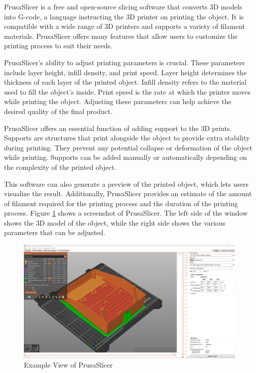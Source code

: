 PrusaSlicer is a free and open-source slicing software that converts 3D models into G-code, a language instructing the 3D printer on printing the object. It is compatible with a wide range of 3D printers and supports a variety of filament materials. PrusaSlicer offers many features that allow users to customize the printing process to suit their needs.

PrusaSlicer's ability to adjust printing parameters is crucial. These parameters include layer height, infill density, and print speed. Layer height determines the thickness of each layer of the printed object. Infill density refers to the material used to fill the object's inside. Print speed is the rate at which the printer moves while printing the object. Adjusting these parameters can help achieve the desired quality of the final product.

PrusaSlicer offers an essential function of adding support to the 3D prints. Supports are structures that print alongside the object to provide extra stability during printing. They prevent any potential collapse or deformation of the object while printing. Supports can be added manually or automatically depending on the complexity of the printed object.

This software can also generate a preview of the printed object, which lets users visualize the result. Additionally, PrusaSlicer provides an estimate of the amount of filament required for the printing process and the duration of the printing process. Figure \ref{fig:prusa_slicer} shows a screenshot of PrusaSlicer. The left side of the window shows the 3D model of the object, while the right side shows the various parameters that can be adjusted.

\begin{figure}
    \centering
    \includegraphics[width=0.8\linewidth]{texs/Part1/chapter1/image/prusaslicer.png}
    \caption{Example View of PrusaSlicer}
    \label{fig:prusa_slicer}
\end{figure}


